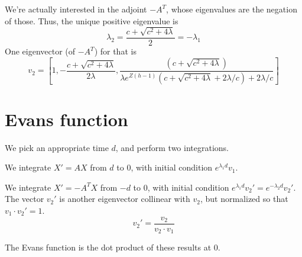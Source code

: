 \documentclass[10pt]{article}
\begin{document}
We're actually interested in the adjoint $-A^T$, whose eigenvalues are the negation of those.
Thus, the unique positive eigenvalue is
\[\lambda_2 = \frac{c + \sqrt{c^2 + 4 \lambda}}{2} = -\lambda_1 \]
One eigenvector (of $-A^T$) for that is
\[
v_2 = \left[1, -\frac{c + \sqrt{c^2 + 4 \lambda}}{2\lambda}, \frac{(c + \sqrt{c^2+4\lambda})}{\lambda e^{Z(h-1)}(c + \sqrt{c^2+4\lambda} + 2 \lambda/c)+ 2 \lambda / c}\right]
\]


\section{Evans function}
We pick an appropriate time $d$, and perform two integrations.

We integrate $X' = AX$ from $d$ to $0$, with initial condition $e^{\lambda_1 d}v_1$.

We integrate $X' = -A^T X$ from $-d$ to $0$, with initial condition $e^{\lambda_1 d}v_2' = e^{-\lambda_2 d}v_2'$. The vector $v_2'$ is another eigenvector collinear with $v_2$, but normalized so that $v_1 \cdot v_2' = 1$.
\[v_2' = \frac{v_2}{v_2 \cdot v_1}\]

The Evans function is the dot product of these results at $0$.
\end{document}
